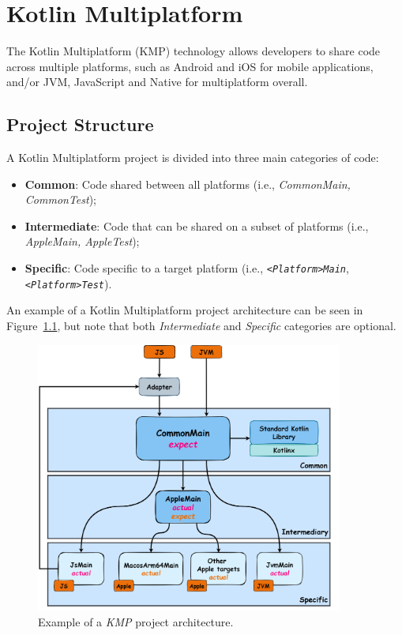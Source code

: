 \chapter{Kotlin Multiplatform}\label{ch:kotlin-multiplatform}

The Kotlin Multiplatform (KMP) technology allows developers to share code across multiple platforms, such as Android and iOS for mobile applications, and/or JVM, JavaScript and Native for multiplatform overall.


\section{Project Structure}\label{sec:project-structure}

A Kotlin Multiplatform project is divided into three main categories of code:

\begin{itemize}
    \item \textbf{Common}: Code shared between all platforms (i.e., \textit{CommonMain, CommonTest});
    \item \textbf{Intermediate}: Code that can be shared on a subset of platforms (i.e., \textit{AppleMain, AppleTest});
    \item \textbf{Specific}: Code specific to a target platform (i.e., \texttt{\textit{<Platform>Main}}, \texttt{\textit{<Platform>Test}}).
\end{itemize}


An example of a Kotlin Multiplatform project architecture can be seen in Figure~\ref{fig:kmp-architecture}, but note that both \textit{Intermediate} and \textit{Specific} categories are optional.

\begin{figure}[!htb]
    \centering
    \includegraphics[width=0.9\textwidth]{../figures/02_kmp-architecture}
    \caption{Example of a \textit{KMP} project architecture.}
    \label{fig:kmp-architecture}
\end{figure}

